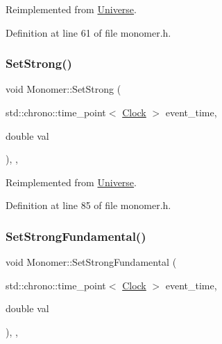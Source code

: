 Reimplemented from \hyperlink{class_universe_ae2ae1c3b3e4cde2c18f5f6a814761ec8}{Universe}.



Definition at line 61 of file monomer.\+h.

\mbox{\label{class_monomer_a10b864f6bcad43f11a2316dbbe4c4742}} 
\subsubsection{\texorpdfstring{Set\+Strong()}{SetStrong()}}
{\footnotesize\ttfamily void Monomer\+::\+Set\+Strong (\begin{DoxyParamCaption}\item[{std\+::chrono\+::time\+\_\+point$<$ \hyperlink{universe_8h_a0ef8d951d1ca5ab3cfaf7ab4c7a6fd80}{Clock} $>$}]{event\+\_\+time,  }\item[{double}]{val }\end{DoxyParamCaption})\hspace{0.3cm}{\ttfamily [inline]}, {\ttfamily [final]}, {\ttfamily [virtual]}}



Reimplemented from \hyperlink{class_universe_a5946c8f3d4cda305f3ecd10df21a2f94}{Universe}.



Definition at line 85 of file monomer.\+h.

\mbox{\label{class_monomer_ad9df06c1a8264bfdb514ef3ba04ef4c7}} 
\subsubsection{\texorpdfstring{Set\+Strong\+Fundamental()}{SetStrongFundamental()}}
{\footnotesize\ttfamily void Monomer\+::\+Set\+Strong\+Fundamental (\begin{DoxyParamCaption}\item[{std\+::chrono\+::time\+\_\+point$<$ \hyperlink{universe_8h_a0ef8d951d1ca5ab3cfaf7ab4c7a6fd80}{Clock} $>$}]{event\+\_\+time,  }\item[{double}]{val }\end{DoxyParamCaption})\hspace{0.3cm}{\ttfamily [inline]}, {\ttfamily [final]}, {\ttfamily [virtual]}}



